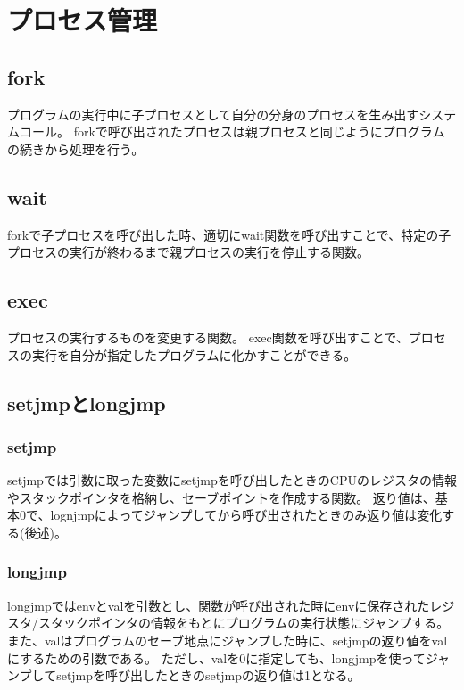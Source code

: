 \section{プロセス管理}
\subsection*{fork}
プログラムの実行中に子プロセスとして自分の分身のプロセスを生み出すシステムコール。
forkで呼び出されたプロセスは親プロセスと同じようにプログラムの続きから処理を行う。

\subsection*{wait}
forkで子プロセスを呼び出した時、適切にwait関数を呼び出すことで、特定の子プロセスの実行が終わるまで親プロセスの実行を停止する関数。

\subsection*{exec}
プロセスの実行するものを変更する関数。
exec関数を呼び出すことで、プロセスの実行を自分が指定したプログラムに化かすことができる。

\subsection*{setjmpとlongjmp}
\subsubsection*{setjmp}
setjmpでは引数に取った変数にsetjmpを呼び出したときのCPUのレジスタの情報やスタックポインタを格納し、セーブポイントを作成する関数。
返り値は、基本0で、lognjmpによってジャンプしてから呼び出されたときのみ返り値は変化する(後述)。

\subsubsection*{longjmp}
longjmpではenvとvalを引数とし、関数が呼び出された時にenvに保存されたレジスタ/スタックポインタの情報をもとにプログラムの実行状態にジャンプする。
また、valはプログラムのセーブ地点にジャンプした時に、setjmpの返り値をvalにするための引数である。
ただし、valを0に指定しても、longjmpを使ってジャンプしてsetjmpを呼び出したときのsetjmpの返り値は1となる。
